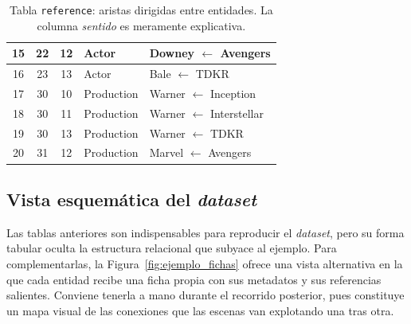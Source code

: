 \begin{table}[h]
\begin{tabular}{|c|c|c|l|l|}
    15 & 22 & 12 & Actor      & Downey $\leftarrow$ Avengers      \\ \hline
    16 & 23 & 13 & Actor      & Bale $\leftarrow$ TDKR            \\ \hline
    17 & 30 & 10 & Production & Warner $\leftarrow$ Inception     \\ \hline
    18 & 30 & 11 & Production & Warner $\leftarrow$ Interstellar  \\ \hline
    19 & 30 & 13 & Production & Warner $\leftarrow$ TDKR          \\ \hline
    20 & 31 & 12 & Production & Marvel $\leftarrow$ Avengers      \\ \hline
  \end{tabular}
  \caption[Tabla \texttt{reference} del mini-\textit{dataset}]{Tabla \texttt{reference}: aristas dirigidas entre entidades. La
  columna \textit{sentido} es meramente explicativa.}
  \label{tab:ejemplo_reference}
\end{table}

\FloatBarrier

\subsection{Vista esquemática del \textit{dataset}}
\label{subsec:ejemplo_esquema}

Las tablas anteriores son indispensables para reproducir el \textit{dataset},
pero su forma tabular oculta la estructura relacional que subyace al
ejemplo. Para complementarlas, la Figura~\ref{fig:ejemplo_fichas} ofrece
una vista alternativa en la que cada entidad recibe una ficha propia con
sus metadatos y sus referencias salientes. Conviene tenerla a mano
durante el recorrido posterior, pues constituye un mapa visual de las
conexiones que las escenas van explotando una tras otra.

